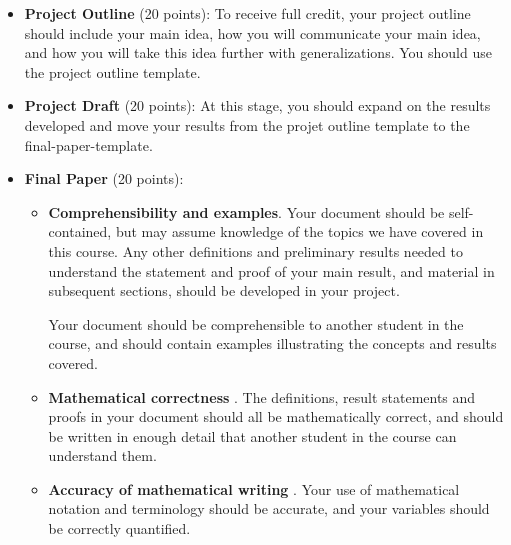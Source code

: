 \documentclass{article}
\begin{document}
\begin{itemize}
    \item \textbf{Project Outline} (20 points): To receive full credit, your project outline should include your main idea, how you will communicate your main idea, and how you will take this idea further with generalizations. You should use the project outline template.
    \item \textbf{Project Draft} (20 points): At this stage, you should expand on the results developed and move your results from the projet outline template to the final-paper-template.

    \item \textbf{Final Paper} (20 points):
    \begin{itemize}
        \item \textbf{Comprehensibility and examples}. 
        Your document should be self-contained, but may assume knowledge of the topics we have covered in this course. Any other definitions and preliminary results needed to understand the statement and proof of your main result, and material in subsequent sections, should be developed in your project.
        
        Your document should be comprehensible to another student in the course, and should contain examples illustrating the concepts and results covered.
        \item \textbf{Mathematical correctness} . The definitions, result statements and proofs in your document should all be mathematically correct, and should be written in enough detail that another student in the course can understand them.
        \item \textbf{Accuracy of mathematical writing} . Your use of mathematical notation and terminology should be accurate, and your variables should be correctly quantified.
    

\end{itemize}
\end{itemize}
\end{document}

